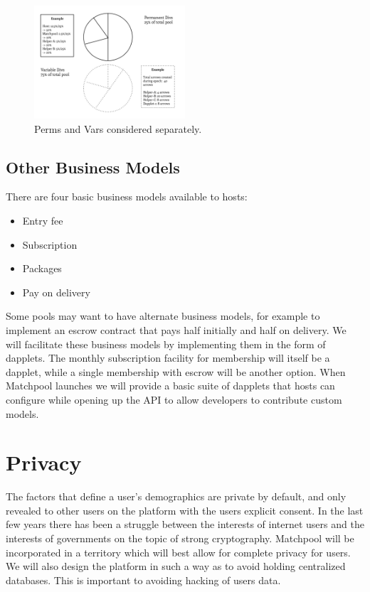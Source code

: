\documentclass[a4paper]{article}
\begin{document}
\begin{figure}[!ht]
\centering
\includegraphics[width=0.5\textwidth]{permanent-temporarydivs_480.png}
\caption{\label{fig:Matchmakers} Perms and Vars considered separately.}
\end{figure}

\subsection{Other Business Models}
There are four basic business models available to hosts:
\begin{itemize}
\item
Entry fee
\item
Subscription
\item
Packages
\item
Pay on delivery
\end{itemize}
Some pools may want to have alternate business models, for example to implement an escrow contract that pays half initially and half on delivery. We will facilitate these business models by implementing them in the form of dapplets. The monthly subscription facility for membership will itself be a dapplet, while a single membership with escrow will be another option. When Matchpool launches we will provide a basic suite of dapplets that hosts can configure while opening up the API to allow developers to contribute custom models.

\section{Privacy}
The factors that define a user's demographics are private by default, and only revealed to other users on the platform with the users explicit consent. In the last few years there has been a struggle between the interests of internet users and the interests of governments on the topic of strong cryptography. Matchpool will be incorporated in a territory which will best allow for complete privacy for users. We will also design the platform in such a way as to avoid holding centralized databases. This is important to avoiding hacking of users data.
\end{document}
